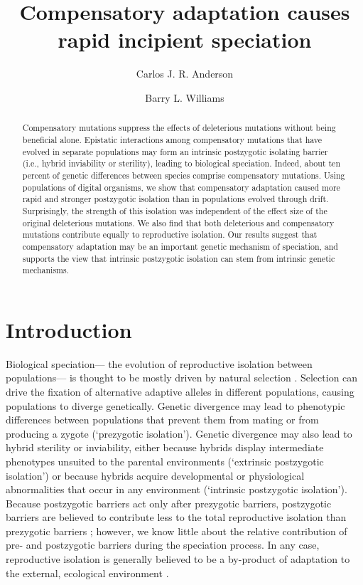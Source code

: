 \documentclass{article}
\title{Compensatory adaptation causes rapid incipient speciation}
\author{Carlos J. R. Anderson \and Barry L. Williams}
\begin{document}
\maketitle

\begin{abstract}
Compensatory mutations suppress the effects of deleterious mutations
without being beneficial alone.
%
Epistatic interactions among compensatory mutations that have
evolved in separate populations may form an intrinsic
postzygotic isolating barrier (i.e., hybrid inviability or sterility),
leading to biological speciation.
%
Indeed, about ten percent of genetic differences between species
comprise compensatory mutations.
%
Using populations of digital organisms, we show that
compensatory adaptation caused more rapid and stronger
postzygotic isolation than in
populations evolved through drift.
%
Surprisingly, the strength of this isolation was independent
of the effect size of the original deleterious mutations.
%
We also find that
both deleterious and compensatory mutations
contribute equally to reproductive isolation.
%
Our results suggest that compensatory adaptation may be
an important genetic mechanism of speciation,
and supports the view that intrinsic postzygotic isolation
can stem from intrinsic genetic mechanisms.
\end{abstract}



\section*{Introduction}

Biological speciation---%
the evolution of reproductive isolation between pop\-u\-la\-tions---%
is thought to be mostly driven by natural selection \cite{coy04,sch09,sob10}.
%
Selection can drive the fixation of alternative adaptive alleles
in different populations, causing populations to diverge genetically.
%
Genetic divergence may lead to phenotypic differences
between populations that prevent them from mating
or from producing a zygote (`prezygotic isolation').
%
Genetic divergence may also lead to hybrid sterility or inviability,
either because hybrids display intermediate phenotypes
unsuited to the parental environments (`extrinsic postzygotic isolation')
or because hybrids acquire developmental or physiological abnormalities
that occur in any environment (`intrinsic postzygotic isolation').
%
Because postzygotic barriers act only after prezygotic barriers,
postzygotic barriers are believed to contribute less
to the total reproductive isolation than prezygotic barriers \cite{sch10};
however, we know little about the relative contribution
of pre- and postzygotic barriers during the speciation process.
%
In any case, reproductive isolation is generally believed
to be a by-product of adaptation to the external,
ecological environment \cite{coy04,sob10}.
\end{document}
